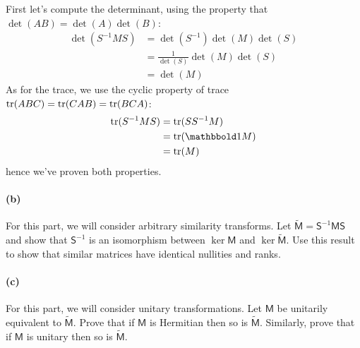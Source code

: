\documentclass{article}
\begin{document}
\begin{solution}
	First let's compute the determinant, using the property that $\det(AB) = \det(A)\det(B)$:
	\begin{align*}
		\det(S^{-1}MS) &= \det(S^{-1}) \det(M) \det(S)\\
		&= \frac{1}{\det(S)} \det(M) \det(S)  \\
		&=  \det(M) 
	\end{align*}
	As for the trace, we use the cyclic property of trace $\operatorname{tr}(ABC) = \operatorname{tr}(CAB) = \operatorname{tr}(BCA)$:
	\begin{align*}
		\tr(S^{-1}MS) &= \tr(SS^{-1}M) \\
		&= \tr(\mathbbold 1 M) \\
		&= \tr(M) 
	\end{align*}
	hence we've proven both properties. 
\end{solution}


\phline
\paragraph{(b)}		\extrapart
For this part, we will consider arbitrary similarity transforms.  Let $\widetilde{\mathsf{M}} = \mathsf{S}^{-1}\mathsf{MS}$ and show that $\mathsf{S}^{-1}$ is an 
isomorphism between $\ker{\mathsf{M}}$ and $\ker{\widetilde{\mathsf{M}}}$.  Use this result to show that similar matrices have identical nullities and ranks.\\


\paragraph{(c)}
For this part, we will consider unitary transformations.  Let $\mathsf{M}$ be unitarily equivalent to $\widetilde{\mathsf{M}}$.  
Prove that if $\mathsf{M}$ is Hermitian then so is $\widetilde{\mathsf{M}}$.
Similarly, prove that if $\mathsf{M}$ is unitary then so is $\widetilde{\mathsf{M}}$.\\
\end{document}

